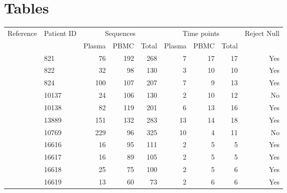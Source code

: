 \documentclass[12pt]{article}
\begin{document}
\clearpage


\section * {Tables}

\begin{table}[!ht]
\def\arraystretch{1.3}%
\begin{center}
\begin{tabular}{llrrrrrrr} 

Reference & Patient ID & \multicolumn{3}{c}{Sequences} & \multicolumn{3}{c}{Time points} & Reject Null \\ 
 &  & Plasma & PBMC & Total & Plasma & PBMC & Total\\
\hline
\cite{Shankarappa99}%
& 821 &      76 &      192 &      268 &        7 &       17 &       17 &   Yes \\ 
& 822 &      32 &       98 &      130 &        3 &       10 &       10 &   Yes \\ 
& 824 &     100 &      107 &      207 &        7 &        9 &       13 &   Yes \\ 
& 10137 &     24 &      106 &      130 &        2 &       10 &       12 &   No \\ 
& 10138 &     82 &      119 &      201 &        6 &       13 &       16 &   Yes \\
& 13889 &    151 &      132 &      283 &       13 &       14 &       18 &   Yes \\ 
 \cite{Fischer04} & 10769 &    229 &       96 &      325 &       10 &        4 &       11 &   No \\ 
\cite{Llewellyn06} & 16616 &     16 &       95 &      111 &        2 &        5 &        5 &    Yes  \\ 
& 16617 &     16 &       89 &      105 &        2 &        5 &        5 &   Yes \\ 
& 16618 &     25 &       75 &      100 &        2 &        5 &        6 &   Yes \\ 
& 16619 &     13 &       60 &       73 &        2 &        6 &        6 &   Yes \\ 

\end{tabular}
\end{center}
\end{table}
\end{document}
